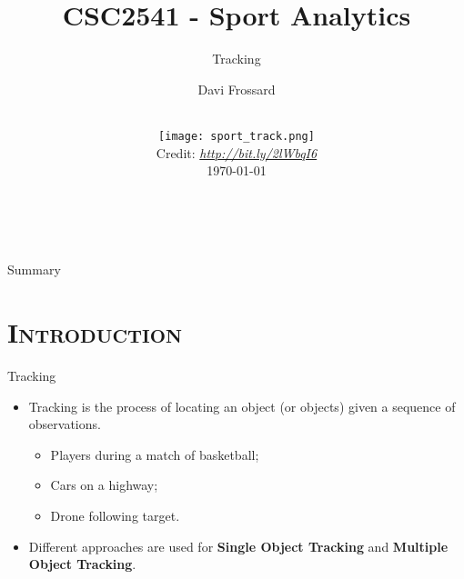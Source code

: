 


\begin{frame}
	\title{CSC2541 - Sport Analytics}
	\subtitle{Tracking}
	\vspace{-1em}\\
	\author{
		Davi Frossard\\
	}
	\date{
		\vspace{-2em}\\
		\texttt{[image: sport\_track.png]}\\[-1ex]
		{\tiny Credit: {\itshape \url{http://bit.ly/2lWbqI6}}}
		\\[1.5ex]
		\today
	}
	\titlepage
\end{frame}

\begin{frame}{Summary}
	\begin{multicols}{2}
		\tableofcontents[hideallsubsections]
	\end{multicols}
\end{frame}

\section{\scshape Introduction}
\begin{frame}{Tracking}
	\begin{itemize}
		\item Tracking is the process of locating an object (or objects) given a sequence of observations.
		\begin{itemize}
			\item Players during a match of basketball;
			\item Cars on a highway;
			\item Drone following target.
		\end{itemize}
		\item Different approaches are used for \textbf{Single Object Tracking} and \textbf{Multiple Object Tracking}.
	\end{itemize}
\end{frame}


